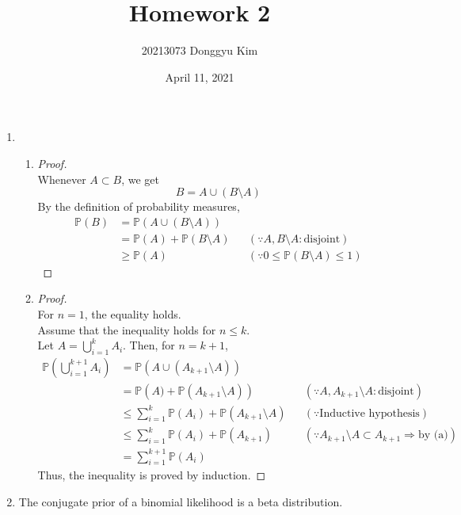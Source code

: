 \documentclass[11pt]{article}
\title{Homework 2}
\author{20213073 Donggyu Kim}
\date{April 11, 2021}
\begin{document}
\maketitle
\thispagestyle{fancy}

\begin{enumerate}
\item
\begin{enumerate}
    \item
    \begin{proof}$ $\\
     Whenever $A\subset B$, we get
    \[B=A\cup (B\setminus A)\]
    By the definition of probability measures,
    \begin{align*}
    \mathbb{P}(B) &= \mathbb{P}(A\cup (B\setminus A)) \\
    &= \mathbb{P}(A) + \mathbb{P}(B\setminus A)
    && (\because A,B\setminus A: \text{disjoint}) \\
    &\ge \mathbb{P}(A) && (\because 0 \le\mathbb{P}(B\setminus A)\le 1)
    \end{align*}
    \end{proof}
    \item
    \begin{proof}$ $\\
    For $n=1$, the equality holds. \\
    Assume that the inequality holds for $n\le k$. \\
    Let $A=\bigcup_{i=1}^{k}A_{i}$.
    Then, for $n=k+1$,
    \begin{align*}
    \mathbb{P}\left(\bigcup_{i=1}^{k+1}A_{i}\right)
    &= \mathbb{P}\left(A\cup (A_{k+1}\setminus A)\right) \\
    &= \mathbb{P}\left(A)+\mathbb{P}(A_{k+1}\setminus A)\right)
    && (\because A,A_{k+1}\setminus A: \text{disjoint}) \\
    &\le \sum_{i=1}^{k}\mathbb{P}(A_{i})+\mathbb{P}(A_{k+1}\setminus A)
    && (\because\text{Inductive hypothesis}) \\
    &\le \sum_{i=1}^{k}\mathbb{P}(A_{i})+\mathbb{P}(A_{k+1})
    && (\because A_{k+1}\setminus A\subset A_{k+1}\Rightarrow\text{by (a)}) \\
    &= \sum_{i=1}^{k+1}\mathbb{P}(A_{i})
    \end{align*}
    Thus, the inequality is proved by induction.
    \end{proof}
\end{enumerate}
\item
    The conjugate prior of a binomial likelihood is a beta distribution.

\end{enumerate}
\end{document}
